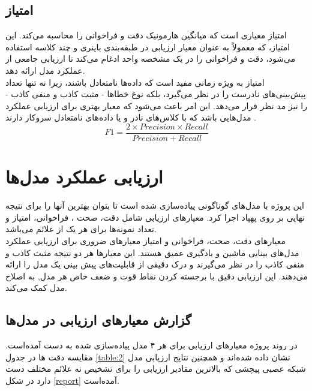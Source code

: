 \subsection{امتیاز }
امتیاز  معیاری است که میانگین هارمونیک دقت و فراخوانی را محاسبه می‌کند. این امتیاز، که معمولاً به عنوان معیار ارزیابی در طبقه‌بندی باینری و چند کلاسه استفاده می‌شود، دقت و فراخوانی را در یک مشخصه
واحد ادغام می‌کند تا ارزیابی جامعی از عملکرد مدل ارائه دهد.
\\
امتیاز  به ویژه زمانی مفید است که داده‌ها نامتعادل باشند، زیرا نه تنها تعداد پیش‌بینی‌های نادرست را در نظر می‌گیرد، بلکه نوع خطاها - مثبت کاذب و منفی کاذب - را نیز مد نظر قرار می‌دهد. این امر باعث می‌شود که  معیار بهتری برای ارزیابی عملکرد مدل‌هایی باشد که با کلاس‌های نادر و یا داده‌های نامتعادل سروکار دارند \cite{F1scorei14:online}.
\begin{equation}
    F1  = \frac{2 \times Precision \times Recall}{Precision + Recall} 
\end{equation}



\section{ارزیابی عملکرد مدل‌ها}

این پروژه با مدل‌های گوناگونی پیاده‌سازی شده است تا بتوان بهترین آنها را برای نتیجه نهایی بر روی پهپاد اجرا کرد. معیارهای ارزیابی شامل دقت، صحت ، فراخوانی، امتیاز  و
تعداد نمونه‌ها برای هر یک از علائم‌ می‌باشد.
\\
معیار‌های دقت، صحت، فراخوانی و امتیاز  معیارهای ضروری برای ارزیابی عملکرد مدل‌های بینایی ماشین و یادگیری عمیق هستند. این معیار‌ها هر دو نتیجه مثبت کاذب و منفی کاذب را در نظر
می‌گیرند و درک دقیقی از قابلیت‌های پیش بینی یک مدل را ارائه می‌دهند. این ارزیابی دقیق با برجسته کردن نقاط قوت و ضعف خاص هر مدل, به اصلاح مدل کمک می‌کند.


\subsection{گزارش معیارهای ارزیابی در مدل‌ها}
در روند پروژه معیار‌های ارزیابی برای هر ۴ مدل پیاده‌سازی شده به دست آمده‌است. مقایسه دقت ها در جدول \ref{table:2} نشان داده شده‌اند و همچنین نتایج ارزیابی مدل‌ شبکه عصبی پیچشی که بالاترین مقادیر ارزیابی را برای تشخیص نه علائم مختلف دست دارد در شکل \ref{report} آمده‌است.

